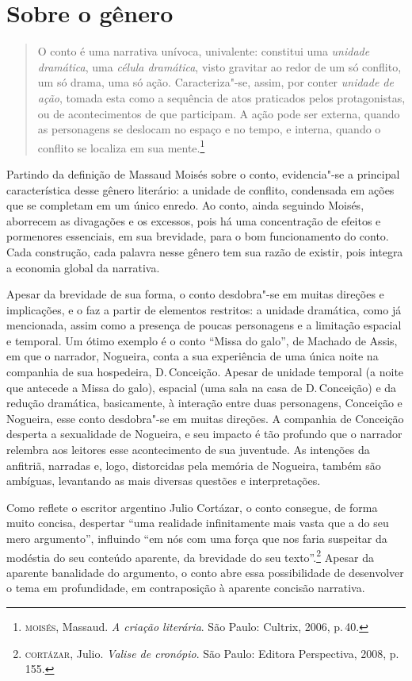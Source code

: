 \section{Sobre o gênero}

\begin{quote}
O conto é uma narrativa unívoca, univalente: constitui
uma \textit{unidade dramática}, uma \textit{célula dramática}, visto gravitar ao
redor de um só conflito, um só drama, uma só ação. Caracteriza"-se,
assim, por conter \textit{unidade de ação}, tomada esta como a sequência de atos praticados pelos protagonistas, ou de acontecimentos de
que participam. A ação pode ser externa, quando as personagens se
deslocam no espaço e no tempo, e interna, quando o conflito se
localiza em sua mente.\footnote{\textsc{moisés}, Massaud. \textit{A criação literária}. São Paulo: Cultrix, 2006, p.\,40.}
\end{quote}

Partindo da definição de Massaud Moisés sobre o conto, evidencia"-se a principal característica desse gênero literário: a unidade de conflito, condensada em ações que se completam em um único enredo. Ao conto, ainda seguindo Moisés, aborrecem as divagações e os excessos, pois há uma concentração de efeitos e pormenores essenciais, em sua brevidade, para o bom funcionamento do conto.
Cada construção, cada palavra nesse gênero tem sua razão de existir, pois integra a economia global da narrativa.

Apesar da brevidade de sua forma, o conto desdobra"-se em muitas direções e implicações, e o faz a partir de elementos restritos: a unidade dramática, como já mencionada, assim como a presença de poucas personagens e a limitação espacial e temporal. Um ótimo exemplo é o conto ``Missa do galo'', de Machado de Assis, em que o narrador, Nogueira, conta a sua experiência de uma única noite na companhia de sua hospedeira, D.\,Conceição. Apesar de unidade temporal (a noite que antecede a Missa do galo), espacial (uma sala na casa de D.\,Conceição) e da redução dramática, basicamente, à interação entre duas personagens, Conceição e Nogueira, esse conto desdobra"-se em muitas direções. A companhia de Conceição desperta a sexualidade de Nogueira, e seu impacto é tão profundo que o narrador relembra aos leitores esse acontecimento de sua juventude. As intenções da anfitriã, narradas e, logo, distorcidas pela memória de Nogueira, também são ambíguas, levantando as mais diversas questões e interpretações.

Como reflete o escritor argentino Julio Cortázar, o conto consegue, de forma muito concisa, despertar ``uma realidade infinitamente mais vasta que a do seu mero argumento'', influindo ``em nós com uma força que nos faria suspeitar da modéstia do seu conteúdo aparente, da brevidade do seu texto''.\footnote{\textsc{cortázar}, Julio. \textit{Valise de cronópio}. São Paulo: Editora Perspectiva, 2008, p.\,155.}
Apesar da aparente banalidade do argumento, o conto abre essa possibilidade de desenvolver o tema em profundidade, em contraposição à aparente concisão narrativa.

